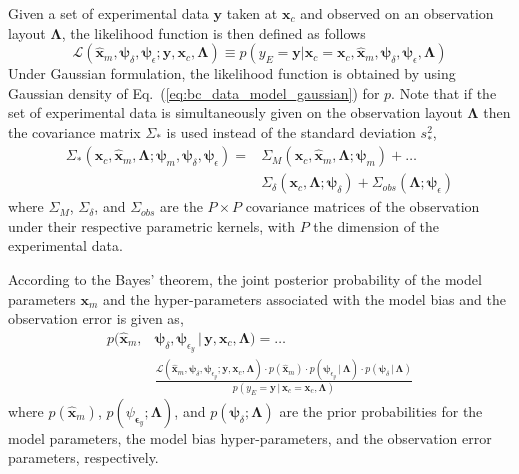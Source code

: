 Given a set of experimental data $\mathbf{y}$ taken at $\mathbf{x}_c$ and observed on an observation layout $\bm{\Lambda}$,
the likelihood function is then defined as follows
\begin{equation}
  \mathcal{L}(\hat{\bm{x}}_m, \bm{\psi}_\delta, \bm{\psi}_\epsilon; \mathbf{y}, \mathbf{x}_c, \bm{\Lambda}) \equiv p(y_E = \mathbf{y} | \bm{x}_c = \mathbf{x}_c, \hat{\bm{x}}_m, \bm{\psi}_\delta, \bm{\psi}_{\epsilon}, \bm{\Lambda})
\label{eq:bc_likelihood}
\end{equation}
Under Gaussian formulation, the likelihood function is obtained by using Gaussian density of Eq.~(\ref{eq:bc_data_model_gaussian}) for $p$.
Note that if the set of experimental data is simultaneously given on the observation layout $\bm{\Lambda}$ then the covariance matrix $\Sigma_*$ is used instead of the standard deviation $s^2_*$,
\begin{equation}
	\begin{split}
	\Sigma_*(\bm{x}_c, \hat{\bm{x}}_m, \bm{\Lambda}; \bm{\psi}_m, \bm{\psi}_\delta, \bm{\psi}_\epsilon) = & \Sigma_M(\bm{x}_c, \hat{\bm{x}}_m, \bm{\Lambda}; \bm{\psi}_{m}) + \ldots \\ 
	& \Sigma_\delta(\bm{x}_c, \bm{\Lambda}; \bm{\psi}_\delta) + \Sigma_{obs}(\bm{\Lambda}; \bm{\psi}_\epsilon)
	\end{split}
\label{eq:bc_gaussian_covariance_matrix}
\end{equation}
where $\Sigma_M$, $\Sigma_\delta$, and $\Sigma_{obs}$ are the $P \times P$ covariance matrices of the observation under their respective parametric kernels, with $P$ the dimension of the experimental data.

According to the Bayes' theorem, the joint posterior probability of the model parameters $\bm{x}_m$ and
the hyper-parameters associated with the model bias and the observation error is given as, 
\begin{equation}
	\begin{split}
  p(\hat{\bm{x}}_m, & \bm{\psi}_\delta, \bm{\psi}_{\epsilon_y}\,|\,\mathbf{y}, \mathbf{x}_c, \bm{\Lambda}) = \ldots \\
	& \frac{\mathcal{L}(\hat{\bm{x}}_m, \bm{\psi}_\delta, \bm{\psi}_{\epsilon_y} ; \mathbf{y}, \mathbf{x}_c, \bm{\Lambda}) \cdot p(\hat{\bm{x}}_m) \cdot p(\bm{\psi}_{\epsilon_y}\,|\,\bm{\Lambda}) \cdot p(\bm{\psi}_{\delta}\,|\,\bm{\Lambda})}{p(y_E = \mathbf{y}\,|\,\bm{x}_c = \mathbf{x}_c , \bm{\Lambda})}
	\end{split}
\label{eq:bc_joint_posterior}
\end{equation}
where $p(\hat{\bm{x}}_m)$, $p(\psi_{\bm{\epsilon}_y}; \bm{\Lambda})$, and $p(\bm{\psi}_{\delta}; \bm{\Lambda})$ are the prior probabilities for the model parameters, the model bias hyper-parameters, and the observation error parameters, respectively.

